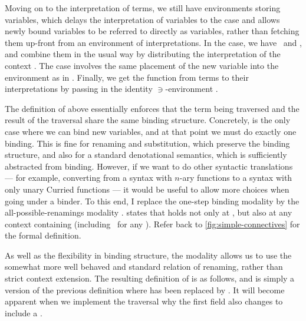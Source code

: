 
Moving on to the interpretation of terms, we still have environments storing
variables, which delays the interpretation of
variables to the  case and allows newly
bound variables to be referred to directly as variables, rather than fetching
them up-front from an environment of interpretations.
In the  case, we have
\ and
, and combine them in the usual way
by distributing the interpretation of the context
.
The  case involves the same placement of
the new variable into the environment as in .
Finally, we get the function  from terms to their
interpretations by passing in the identity $\ni$-environment .


The definition of  above essentially enforces that the
term being traversed and the result of the traversal share the same binding
structure.
Concretely,  is the only case where we can bind
new variables, and at that point we must do exactly one binding.
This is fine for renaming and substitution, which preserve the binding
structure, and also for a standard denotational semantics, which is sufficiently
abstracted from binding.
However, if we want to do other syntactic translations --- for example,
converting from a syntax with $n$-ary functions to a syntax with only unary
Curried functions --- it would be useful to allow more choices when going under
a binder.
To this end, I replace the one-step binding modality \AgdaFunction{$\bigcirc$}
by the all-possible-renamings modality \AgdaFunction{$\Box$}.
\AgdaFunction{$\Box$}\AgdaSpace{}\AgdaSpace{}\AgdaBound{$\Gamma$}
states that  holds not only at \AgdaBound{$\Gamma$}, but also at
any context \AgdaBound{$\Gamma^+$} containing \AgdaBound{$\Gamma$} (including
\ for any \AgdaBound{$\Delta$}).
Refer back to \cref{fig:simple-connectives} for the formal definition.

As well as the flexibility in binding structure, the \AgdaFunction{$\Box$}
modality allows us to use the somewhat more well behaved and standard
relation of renaming, rather than strict context extension.
The resulting definition of  is as follows, and is
simply a version of the previous definition where \AgdaFunction{$\bigcirc$}
has been replaced by \AgdaFunction{$\Box$}.
It will become apparent when we implement the traversal  why
the first field also changes to include a \AgdaFunction{$\Box$}.

